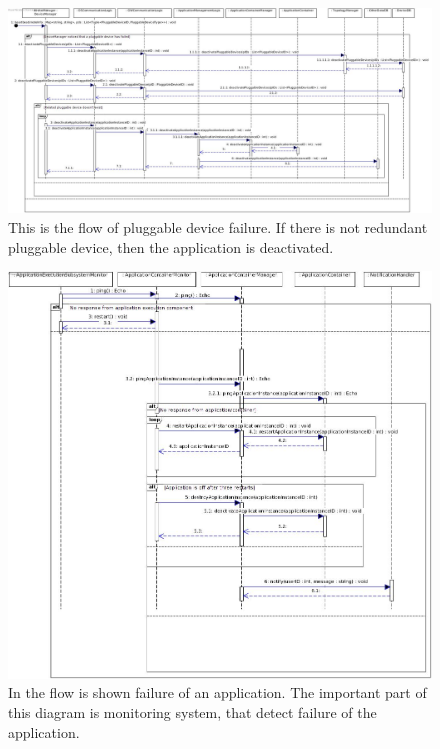     \begin{figure}[!htp]
    	\centering
    	\includegraphics[width=\textwidth]{images/sequence-Av3-UC14-UC18}
    	\caption[Scenario ]{This is the flow of pluggable device failure. If there is not redundant pluggable device, then the application is deactivated.}\label{fig:seq_scenario4}
    \end{figure}

    \begin{figure}[!htp]
    	\centering
    	\includegraphics[width=\textwidth]{images/sequence-Av2}
    	\caption[Application crash]{ In the flow is shown failure of an application. The important part of this diagram is monitoring system, that detect failure of the application. }\label{fig:seq_scenario5}
    \end{figure}

